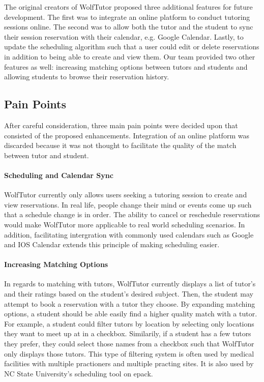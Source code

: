 
The original creators of WolfTutor proposed three additional features for future development. The first was to integrate an online platform to conduct tutoring sessions online. The second was to allow both the tutor and the student to sync their session reservation with their calendar, e.g. Google Calendar. Lastly, to update the scheduling algorithm such that a user could edit or delete reservations in addition to being able to create and view them. Our team provided two other features as well: increasing matching options between tutors and students and allowing students to browse their reservation history. 

\subsection{Pain Points}
\label{sec:pain-points}
After careful consideration, three main pain points were decided upon that consisted of the proposed enhancements. Integration of an online platform was discarded because it was not thought to facilitate the quality of the match between tutor and student.

\paragraph{Scheduling and Calendar Sync}
WolfTutor currently only allows users seeking a tutoring session to create and view reservations. In real life, people change their mind or events come up such that a schedule change is in order. The ability to cancel or reschedule reservations would make WolfTutor more applicable to real world scheduling scenarios. In addition, facilitating intergration with commonly used calendars such as Google and IOS Calendar extends this principle of making scheduling easier.

\paragraph{Increasing Matching Options}
In regards to matching with tutors, WolfTutor currently displays a list of tutor's and their ratings based on the student's desired subject. Then, the student may attempt to book a reservation with a tutor they choose. By expanding matching options, a student should be able easily find a higher quality match with a tutor. For example, a student could filter tutors by location by selecting only locations they want to meet up at in a checkbox. Similarily, if a student has a few tutors they prefer, they could select those names from a checkbox such that WolfTutor only displays those tutors. This type of filtering system is often used by medical facilities with multiple practioners and multiple practing sites. It is also used by NC State University's scheduling tool on epack.

